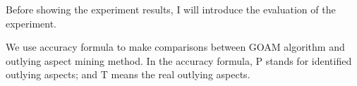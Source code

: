 \documentclass[
 size=14pt,
 paper=smartboard,  %
 mode=present, 		%
 display=slides, 	%
 style=tuliplab,  	%
 pauseslide,
 fleqn,leqno]{powerdot}
\begin{document}





\begin{note}
Before showing the experiment results,
I will introduce the evaluation of the experiment.

We use accuracy formula to make comparisons between GOAM algorithm
and outlying aspect mining method.
In the accuracy formula,
P stands for identified outlying aspects;
and T means the real outlying aspects.
\end{note}





\end{document}
